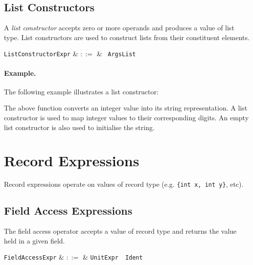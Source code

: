 \subsection{List Constructors}
\label{c_expr_list_constructor}
A {\em list constructor} accepts zero or more operands and produces a value of list type.  List constructors are used to construct lists from their constituent elements.  

\begin{syntax}
  \verb+ListConstructorExpr+ & $::=$ & \token{[}\ \verb+ArgsList+ \token{]}\\
\end{syntax}

\paragraph{Example.}  The following example illustrates a list constructor:



The above function converts an integer value into its string representation.  A list constructor is used to map integer values to their corresponding digits.  An empty list constructor is also used to initialise the string.


\section{Record Expressions}
\label{c_expr_record}

Record expressions operate on values of record type (e.g. \lstinline|{int x, int y}|, etc).


\subsection{Field Access Expressions}
\label{c_expr_field_access}

The field access operator accepts a value of record type and returns the value held in a given field.

\begin{syntax}
  \verb+FieldAccessExpr+ & $::=$ & \verb+UnitExpr+\ \ \verb+Ident+\\
\end{syntax}

